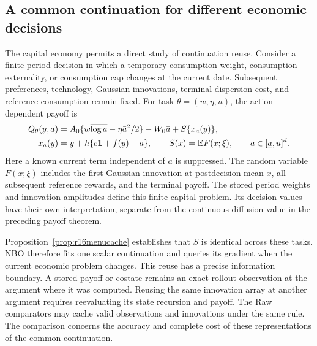 \subsection{A common continuation for different economic decisions}
\label{sec:r16menumain}
The capital economy permits a direct study of continuation reuse. Consider a
finite-period decision in which a temporary consumption weight, consumption
externality, or consumption cap changes at the current date. Subsequent preferences,
technology, Gaussian innovations, terminal dispersion cost, and reference
consumption remain fixed. For task $\theta=(w,\eta,u)$, the action-dependent
payoff is
\begin{align}
 Q_\theta(y,a)&=A_0\{w\overline{\log a}-\eta\bar a^2/2\}
                   -W_0\bar a+S\{x_a(y)\},\notag\\
 x_a(y)&=y+h\{c\bm1+f(y)-a\},\qquad
 S(x)=\mathbb E F(x;\xi),\qquad a\in[\underline a,u]^d.
 \label{eq:r16mainmenu}
\end{align}
Here a known current term independent of $a$ is suppressed. The random
variable $F(x;\xi)$ includes the first Gaussian innovation at postdecision
mean $x$, all subsequent reference rewards, and the terminal payoff. The
stored period weights and innovation amplitudes define this finite capital
problem. Its decision values have their own interpretation, separate from
the continuous-diffusion value in the preceding payoff theorem.

Proposition~\ref{prop:r16menucache} establishes that $S$ is identical across
these tasks. NBO therefore fits one scalar continuation and queries its
gradient when the current economic problem changes. This reuse has a precise
information boundary. A stored payoff or costate remains an exact rollout
observation at the argument where it was computed. Reusing the same innovation
array at another argument requires reevaluating its state recursion and
payoff. The Raw comparators may cache valid observations and innovations under
the same rule. The comparison concerns the accuracy and complete cost of
these representations of the common continuation.

